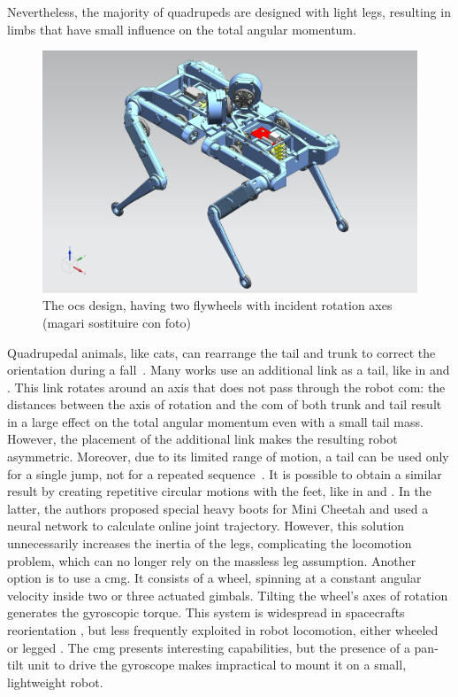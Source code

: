 \documentclass[letterpaper, 10 pt, conference]{ieeeconf}  %
\begin{document}
Nevertheless, the majority of quadrupeds are designed with light legs, resulting in limbs that have small influence on the total angular momentum.

\begin{figure}[t!]
	\centering
	\includegraphics[width=.7\linewidth]{figures/solo_flywheels.png}
	\caption{\small The \gls{ocs} design, having two flywheels with incident rotation axes (magari sostituire con foto)}
	\label{fig:solo12flywheels}
\end{figure} 

Quadrupedal animals, like cats, can rearrange the tail and trunk to correct the orientation during a fall~\cite{kane1969dynamical}.
Many works use an additional link as a tail, like in \cite{chu2019null} and \cite{wenger2016frontal}.
This link rotates around an axis that does not pass through the robot \gls{com}: the distances between the axis of rotation and the \gls{com} of both trunk and tail result in a large effect on the total angular momentum even with a small tail mass.
However, the placement of the additional link makes the resulting robot asymmetric. Moreover, due to its limited range of motion, a tail can be used only for a single jump, not for a repeated sequence~\cite{johnson2012tail}.
It is possible to obtain a similar result by creating repetitive circular motions with the feet, like in \cite{hoffman2021exploiting} and \cite{kurtz2021mini}. In the latter, the authors proposed special heavy boots for Mini Cheetah and used a neural network to calculate online joint trajectory. However, this solution unnecessarily increases the inertia of the legs, complicating the locomotion problem, which can no longer rely on the massless leg assumption. %
Another option is to use a \gls{cmg}.
It consists of a wheel, spinning at a constant angular velocity inside two or three actuated gimbals.
Tilting the wheel's axes of rotation generates the gyroscopic torque.
This system is widespread in spacecrafts reorientation \cite{yoon2002spacecraft}, but less frequently exploited in robot locomotion, either wheeled \cite{brown1996single} or legged \cite{mikhalkov2021gyrubot}.
The \gls{cmg} presents interesting capabilities, but the presence of a pan-tilt unit to drive the gyroscope makes impractical to mount it on a small, lightweight robot.
\end{document}
